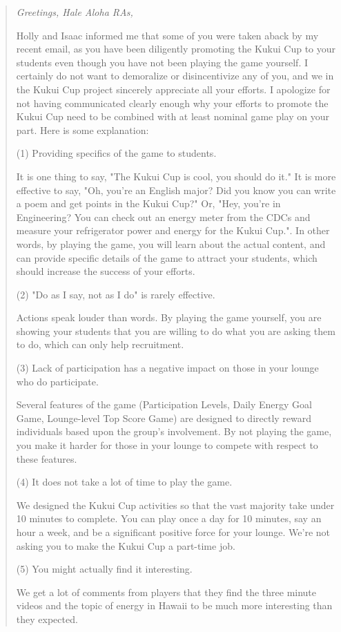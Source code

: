 \documentclass[]{IEEEconf}
\begin{document}
\begin{quotation}
{\em
Greetings, Hale Aloha RAs,

Holly and Isaac informed me that some of you were taken aback by my
recent email, as you have been diligently promoting the Kukui Cup to
your students even though you have not been playing the game yourself.
 I certainly do not want to demoralize or disincentivize any of you,
and we in the Kukui Cup project sincerely appreciate all your efforts.
 I apologize for not having communicated clearly enough why your
efforts to promote the Kukui Cup need to be combined with at least
nominal game play on your part.  Here is some explanation:

\noindent (1) Providing specifics of the game to students.

It is one thing to say, "The Kukui Cup is cool, you should do it."  It
is more effective to say, "Oh, you're an English major? Did you know
you can write a poem and get points in the Kukui Cup?"  Or, "Hey,
you're in Engineering?   You can check out an energy meter from the
CDCs and measure your refrigerator power and energy for the Kukui
Cup.".  In other words, by playing the game, you will learn about the
actual content, and can provide specific details of the game to
attract your students, which should increase the success of your
efforts.

\noindent  (2) "Do as I say, not as I do" is rarely effective.

Actions speak louder than words.    By playing the game yourself, you
are showing your students that you are willing to do what you are
asking them to do, which can only help recruitment.

\noindent  (3) Lack of participation has a negative impact on those in your lounge who do participate.

Several features of the game (Participation Levels, Daily Energy Goal
Game, Lounge-level Top Score Game) are designed to directly reward
individuals based upon the group's involvement. By not playing the
game, you make it harder for those in your lounge to compete with
respect to these features.

\noindent  (4) It does not take a lot of time to play the game.

We designed the Kukui Cup activities so that the vast majority take
under 10 minutes to complete. You can play once a day for 10 minutes,
say an hour a week, and be a significant positive force for your
lounge.  We're not asking you to make the Kukui Cup a part-time job.

\noindent  (5) You might actually find it interesting.

We get a lot of comments from players that they find the three minute
videos and the topic of energy in Hawaii to be much more interesting
than they expected.
}
\end{quotation}
\end{document}
